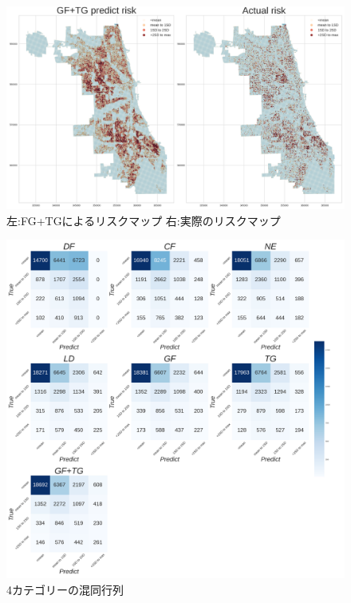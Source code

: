 \begin{figure}
  \centering %
  \includegraphics[scale=0.25]{./non-crime-timeseries-fig/GF+TG_riskmap.png}
  \caption{左:FG+TGによるリスクマップ 右:実際のリスクマップ}
  \label{fig:non-crime-timeseries-gf-tg-risk}
\end{figure}
\begin{figure}
  \centering %
  \includegraphics[scale=0.16]{./non-crime-timeseries-fig/non_crime_timeseries_four_cm.png}
  \caption{4カテゴリーの混同行列}
  \label{fig:non-crime-timeseries-4cm}
\end{figure}

